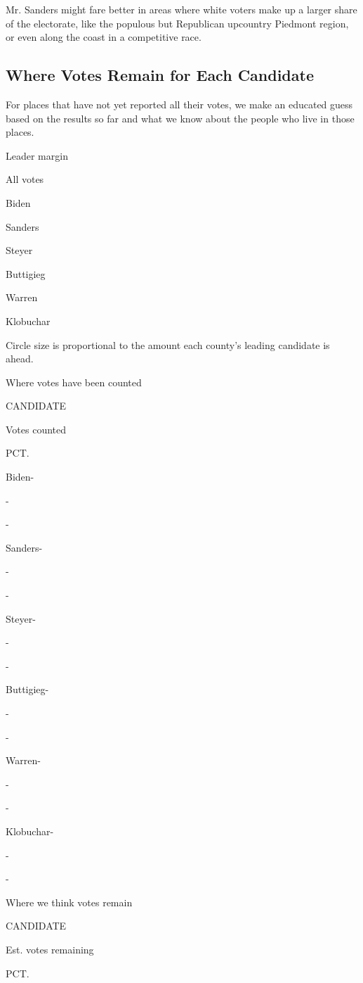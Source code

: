 Mr. Sanders might fare better in areas where white voters make up a
larger share of the electorate, like the populous but Republican
upcountry Piedmont region, or even along the coast in a competitive
race.

\hypertarget{where-votes-remain-for-each-candidate}{%
\subsection{Where Votes Remain for Each
Candidate}\label{where-votes-remain-for-each-candidate}}

For places that have not yet reported all their votes, we make an
educated guess based on the results so far and what we know about the
people who live in those places.

Leader margin

All votes

Biden

Sanders

Steyer

Buttigieg

Warren

Klobuchar

Circle size is proportional to the amount each county's leading
candidate is ahead.

Where votes have been counted

CANDIDATE

Votes counted

PCT.

Biden-

-

-

Sanders-

-

-

Steyer-

-

-

Buttigieg-

-

-

Warren-

-

-

Klobuchar-

-

-

Where we think votes remain

CANDIDATE

Est. votes remaining

PCT.

